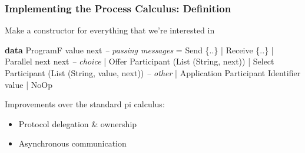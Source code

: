 \documentclass[12pt]{beamer}
\newenvironment{Shaded}{}{}
\newcommand{\KeywordTok}[1]{\textcolor[rgb]{0.00,0.44,0.13}{\textbf{#1}}}
\newcommand{\DataTypeTok}[1]{\textcolor[rgb]{0.56,0.13,0.00}{#1}}
\newcommand{\CommentTok}[1]{\textcolor[rgb]{0.38,0.63,0.69}{\textit{#1}}}
\newcommand{\FunctionTok}[1]{\textcolor[rgb]{0.02,0.16,0.49}{#1}}
\newcommand{\NormalTok}[1]{#1}
\begin{document}
\begin{frame}[fragile, t]
\frametitle{Implementing the Process Calculus: Definition}

Make a constructor for everything that we're interested in

\begin{Shaded}
\begin{Highlighting}[]
\KeywordTok{data} \DataTypeTok{ProgramF}\NormalTok{ value next }
    \CommentTok{-- passing messages}
    \FunctionTok{=} \DataTypeTok{Send}\NormalTok{ \{..\}}
    \FunctionTok{|} \DataTypeTok{Receive}\NormalTok{ \{..\}}
    \FunctionTok{|} \DataTypeTok{Parallel}\NormalTok{ next next }
    \CommentTok{-- choice}
    \FunctionTok{|} \DataTypeTok{Offer} \DataTypeTok{Participant}\NormalTok{ (}\DataTypeTok{List}\NormalTok{ (}\DataTypeTok{String}\NormalTok{, next))}
    \FunctionTok{|} \DataTypeTok{Select} \DataTypeTok{Participant}\NormalTok{ (}\DataTypeTok{List}\NormalTok{ (}\DataTypeTok{String}\NormalTok{, value, next))}
    \CommentTok{-- other}
    \FunctionTok{|} \DataTypeTok{Application} \DataTypeTok{Participant} \DataTypeTok{Identifier}\NormalTok{ value}
    \FunctionTok{|} \DataTypeTok{NoOp}
\end{Highlighting}
\end{Shaded}

Improvements over the standard pi calculus:
\begin{itemize}
    \item Protocol delegation \& ownership
    \item Asynchronous communication 
\end{itemize}


\end{frame}
\end{document}
